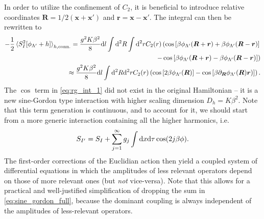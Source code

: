 In order to utilize the confinement of $C_2$, it is beneficial to introduce relative coordinates ${\bm R} = 1/2({\bm x}+{\bm x'})$ and ${\bm r} = {\bm x}-{\bm x'}$.
The integral can then be rewritten to
\begin{align}
    -\frac12\braket{S^2_I[\phi_{\Lambda'}+h]}_{h,{\rm conn.}}
    =
    \frac{g^2K\beta^2}8\mathrm d l\int\mathrm d^2R\int\mathrm d^2r
    C_2(r)
    \left(
        \cos\left[ \beta\phi_{\Lambda'}({\bm R}+{\bm r})+\beta\phi_{\Lambda'}({\bm R}-{\bm r}) \right]
        \right.
        \label{eq:rg_int_1}\\
        \left.-
        \cos\left[ \beta\phi_{\Lambda'}({\bm R}+{\bm r})-\beta\phi_{\Lambda'}({\bm R}-{\bm r}) \right]
    \right)
    \label{eq:rg_int_2}
    \\
    \approx
    \frac{g^2K\beta^2}{8}\mathrm d l\int\mathrm d^2R\mathrm d^2rC_2(r)
    \left(
        \cos\left[ 2\beta\phi_{\Lambda'}({\bm R}) \right]
        -
        \cos\left[ \beta\partial_{\bm R}\phi_{\Lambda'}({\bm R}){\bm r}) \right]
    \right).
    \label{eq:rg_int_rel_coords}
\end{align}
The $\cos$ term in \cref{eq:rg_int_1} did not exist in the original Hamiltonian -- it is a new sine-Gordon type interaction with higher scaling dimension $D_h = K\beta^2$.
Note that this term generation is continuous, and to account for it, we should start from a more generic interaction containing all the higher harmonics, i.e.
\begin{align}
    S_{I'} = S_I + \sum_{j=1}^\infty g_j\int\mathrm d x\mathrm d\tau\cos(2j\beta\phi).
    \label{eq:sine_gordon_full}
\end{align}
The first-order corrections of the Euclidian action then yield a coupled system of differential equations in which the amplitudes of less relevant operators depend on those of more relevant ones (but {\it not} vice-versa).
Note that this allows for a practical and well-justified simplification of dropping the sum in \cref{eq:sine_gordon_full}, because the dominant coupling is always independent of the amplitudes of less-relevant operators.

